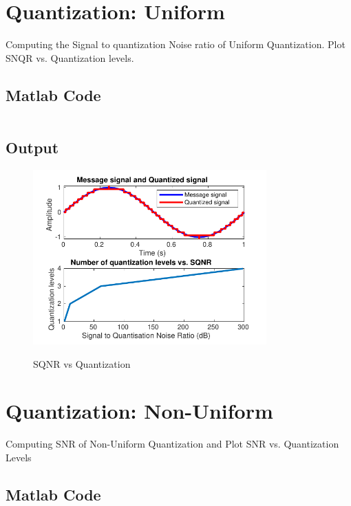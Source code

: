 \section{Quantization: Uniform}
\label{sec:Quantization: Uniform}

Computing the Signal to quantization Noise ratio of Uniform Quantization. 
Plot SNQR vs. Quantization levels.

\subsection{Matlab Code}

\inputminted[fontsize=\footnotesize,autogobble]{matlab}{code/sqnr.m}

\subsection{Output}

\begin{figure}[!htb]
    \centering
    \includegraphics[width=0.8\textwidth]{res/figures/Figure_6.pdf}
    \label{output:SQNR vs quantization}
    \caption{SQNR vs Quantization}
\end{figure}

\section{Quantization: Non-Uniform}
\label{sec:Quantization: Non-Uniform}

Computing SNR of Non-Uniform Quantization and Plot SNR vs. Quantization Levels

\subsection{Matlab Code}


